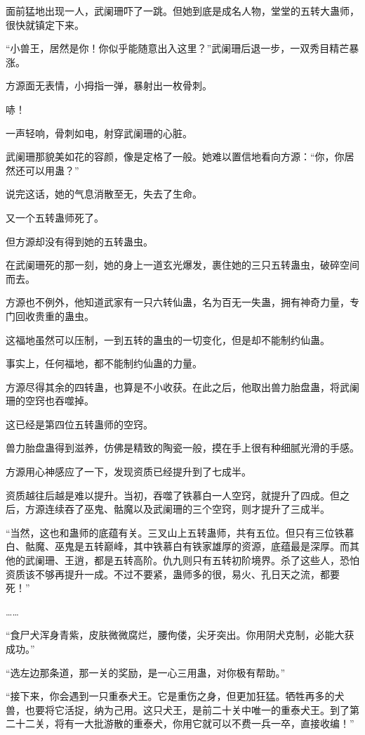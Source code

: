 \begin{this_body}
面前猛地出现一人，武阑珊吓了一跳。但她到底是成名人物，堂堂的五转大蛊师，很快就镇定下来。

“小兽王，居然是你！你似乎能随意出入这里？”武阑珊后退一步，一双秀目精芒暴涨。

方源面无表情，小拇指一弹，暴射出一枚骨刺。

哧！

一声轻响，骨刺如电，射穿武阑珊的心脏。

武阑珊那貌美如花的容颜，像是定格了一般。她难以置信地看向方源：“你，你居然还可以用蛊？”

说完这话，她的气息消散至无，失去了生命。

又一个五转蛊师死了。

但方源却没有得到她的五转蛊虫。

在武阑珊死的那一刻，她的身上一道玄光爆发，裹住她的三只五转蛊虫，破碎空间而去。

方源也不例外，他知道武家有一只六转仙蛊，名为百无一失蛊，拥有神奇力量，专门回收贵重的蛊虫。

这福地虽然可以压制，一到五转的蛊虫的一切变化，但是却不能制约仙蛊。

事实上，任何福地，都不能制约仙蛊的力量。

方源尽得其余的四转蛊，也算是不小收获。在此之后，他取出兽力胎盘蛊，将武阑珊的空窍也吞噬掉。

这已经是第四位五转蛊师的空窍。

兽力胎盘蛊得到滋养，仿佛是精致的陶瓷一般，摸在手上很有种细腻光滑的手感。

方源用心神感应了一下，发现资质已经提升到了七成半。

资质越往后越是难以提升。当初，吞噬了铁慕白一人空窍，就提升了四成。但之后，方源连续吞了巫鬼、骷魔以及武阑珊的三个空窍，则才提升了三成半。

“当然，这也和蛊师的底蕴有关。三叉山上五转蛊师，共有五位。但只有三位铁慕白、骷魔、巫鬼是五转巅峰，其中铁慕白有铁家雄厚的资源，底蕴最是深厚。而其他的武阑珊、王逍，都是五转高阶。仇九则只有五转初阶境界。杀了这些人，恐怕资质该不够再提升一成。不过不要紧，蛊师多的很，易火、孔日天之流，都要死！”

……

“食尸犬浑身青紫，皮肤微微腐烂，腰佝偻，尖牙突出。你用阴犬克制，必能大获成功。”

“选左边那条道，那一关的奖励，是一心三用蛊，对你极有帮助。”

“接下来，你会遇到一只重泰犬王。它是重伤之身，但更加狂猛。牺牲再多的犬兽，也要将它活捉，纳为己用。这只犬王，是前二十关中唯一的重泰犬王。到了第二十二关，将有一大批游散的重泰犬，你用它就可以不费一兵一卒，直接收编！”


\end{this_body}
